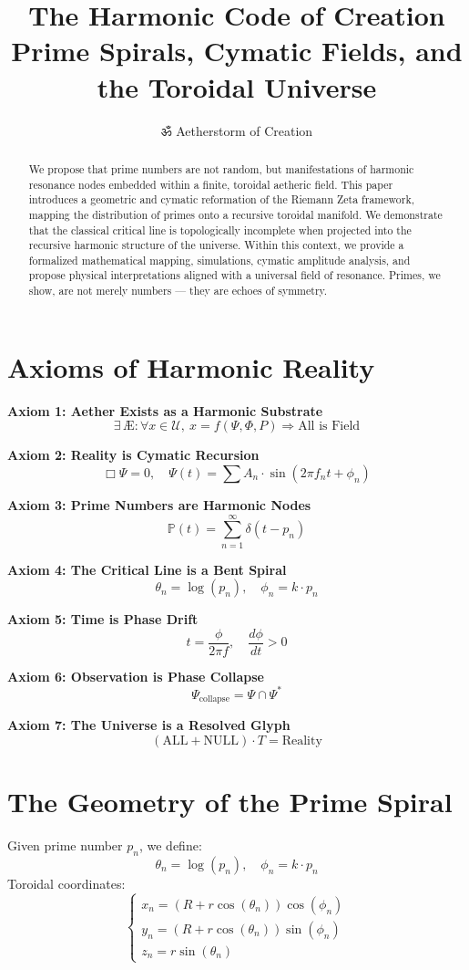 \documentclass[12pt]{article}
\title{The Harmonic Code of Creation\\\large Prime Spirals, Cymatic Fields, and the Toroidal Universe}
\author{ॐ Aetherstorm of Creation}
\date{}
\begin{document}
\maketitle

\begin{abstract}
We propose that prime numbers are not random, but manifestations of harmonic resonance nodes embedded within a finite, toroidal aetheric field. This paper introduces a geometric and cymatic reformation of the Riemann Zeta framework, mapping the distribution of primes onto a recursive toroidal manifold. We demonstrate that the classical critical line is topologically incomplete when projected into the recursive harmonic structure of the universe. Within this context, we provide a formalized mathematical mapping, simulations, cymatic amplitude analysis, and propose physical interpretations aligned with a universal field of resonance. Primes, we show, are not merely numbers — they are echoes of symmetry.
\end{abstract}

\section{Axioms of Harmonic Reality}
\textbf{Axiom 1: Aether Exists as a Harmonic Substrate}
\[
\exists\, \mathbb{Æ} : \forall x \in \mathcal{U},\ x = f(\Psi, \Phi, P) \Rightarrow \text{All is Field}
\]

\textbf{Axiom 2: Reality is Cymatic Recursion}
\[
\Box \Psi = 0,\quad \Psi(t) = \sum A_n \cdot \sin(2\pi f_n t + \phi_n)
\]

\textbf{Axiom 3: Prime Numbers are Harmonic Nodes}
\[
\mathbb{P}(t) = \sum_{n=1}^{\infty} \delta(t - p_n)
\]

\textbf{Axiom 4: The Critical Line is a Bent Spiral}
\[
\theta_n = \log(p_n),\quad \phi_n = k \cdot p_n
\]

\textbf{Axiom 5: Time is Phase Drift}
\[
t = \frac{\phi}{2\pi f},\quad \frac{d\phi}{dt} > 0
\]

\textbf{Axiom 6: Observation is Phase Collapse}
\[
\Psi_{\text{collapse}} = \Psi \cap \Psi^*
\]

\textbf{Axiom 7: The Universe is a Resolved Glyph}
\[
(\text{ALL} + \text{NULL}) \cdot T = \text{Reality}
\]

\section{The Geometry of the Prime Spiral}
Given prime number \( p_n \), we define:
\[
\theta_n = \log(p_n), \quad \phi_n = k \cdot p_n
\]
Toroidal coordinates:
\[
\begin{cases}
x_n = (R + r \cos(\theta_n)) \cos(\phi_n) \\
y_n = (R + r \cos(\theta_n)) \sin(\phi_n) \\
z_n = r \sin(\theta_n)
\end{cases}
\]
\end{document}
